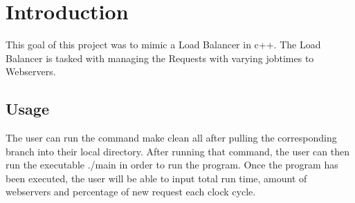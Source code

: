 \hypertarget{index_intro_sec}{}\section{Introduction}\label{index_intro_sec}
This goal of this project was to mimic a Load Balancer in c++. The Load Balancer is tasked with managing the Requests with varying jobtimes to Webservers.\hypertarget{index_Usage}{}\subsection{Usage}\label{index_Usage}
The user can run the command \textquotesingle{}make clean all\textquotesingle{} after pulling the corresponding branch into their local directory. After running that command, the user can then run the executable \textquotesingle{}./main\textquotesingle{} in order to run the program. Once the program has been executed, the user will be able to input total run time, amount of webservers and percentage of new request each clock cycle. 